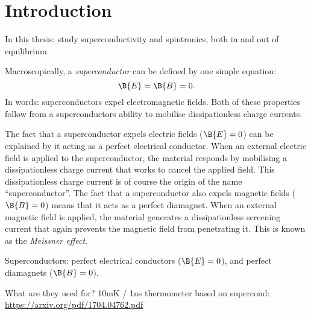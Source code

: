 \chapter{Introduction}\noindent
In this thesis: study superconductivity and spintronics, both in and out of equilibrium.

Macroscopically, a \emph{superconductor} can be defined by one simple equation: 
\begin{equation}
  \B{E} = \B{B} = 0.
\end{equation}
In words: superconductors expel electromagnetic fields.
Both of these properties follow from a superconductors ability to mobilise dissipationless charge currents.

The fact that a superconductor expels electric fields ($\B{E}=0$) can be explained by it acting as a perfect electrical conductor.
When an external electric field is applied to the superconductor, the material responds by mobilising a dissipationless charge current that works to cancel the applied field.
This dissipationless charge current is of course the origin of the name ``superconductor''.
The fact that a superconductor also expels magnetic fields ($\B{B}=0$) means that it acts as a perfect diamagnet.
When an external magnetic field is applied, the material generates a dissipationless screening current that again prevents the magnetic field from penetrating it.
This is known as the \emph{Meissner effect}.


Superconductors: perfect electrical conductors ($\B{E} = 0$), and perfect diamagnets ($\B{B} = 0$).

What are they used for?
10mK / 1ns thermometer based on supercond:
\url{https://arxiv.org/pdf/1704.04762.pdf}

\lipsum
